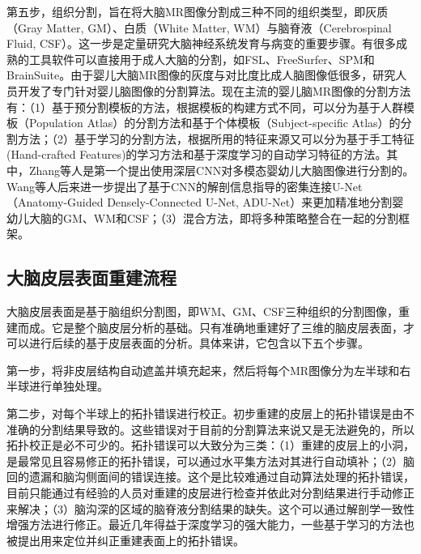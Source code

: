 第五步，组织分割，旨在将大脑MR图像分割成三种不同的组织类型，即灰质（Gray Matter, GM）、白质（White Matter, WM）与脑脊液（Cerebrospinal Fluid, CSF）。这一步是定量研究大脑神经系统发育与病变的重要步骤。有很多成熟的工具软件可以直接用于成人大脑的分割，如FSL\cite{jenkinson2012fsl}、FreeSurfer\cite{fischl2012freesurfer}、SPM\cite{tzourio2002automated}和BrainSuite\cite{shattuck2002brainsuite}。由于婴儿大脑MR图像的灰度与对比度比成人脑图像低很多，研究人员开发了专门针对婴儿脑图像的分割算法\cite{li2019computational}。现在主流的婴儿脑MR图像的分割方法有：（1）基于预分割模板的方法，根据模板的构建方式不同，可以分为基于人群模板（Population Atlas）的分割方法\cite{shi2011infant,wang2014segmentation}和基于个体模板（Subject-specific Atlas）的分割方法\cite{shi2010neonatal}；（2）基于学习的分割方法，根据所用的特征来源又可以分为基于手工特征(Hand-crafted Features)的学习方法\cite{anbeek2013automatic,wang2015links}和基于深度学习的自动学习特征的方法\cite{wang2018volume,nie2016fully,zhang2015deep}。其中，Zhang等人\cite{zhang2015deep}是第一个提出使用深层CNN对多模态婴幼儿大脑图像进行分割的。Wang等人\cite{wang2018volume}后来进一步提出了基于CNN的解剖信息指导的密集连接U-Net\cite{ronneberger2015u}（Anatomy-Guided Densely-Connected U-Net, ADU-Net）\cite{wang2018volume}来更加精准地分割婴幼儿大脑的GM、WM和CSF；（3）混合方法，即将多种策略整合在一起的分割框架\cite{beare2016neonatal,gui2012morphology}。


\subsection{大脑皮层表面重建流程}
大脑皮层表面是基于脑组织分割图，即WM、GM、CSF三种组织的分割图像，重建而成。它是整个脑皮层分析的基础。只有准确地重建好了三维的脑皮层表面，才可以进行后续的基于皮层表面的分析。具体来讲，它包含以下五个步骤。

第一步，将非皮层结构自动遮盖并填充起来，然后将每个MR图像分为左半球和右半球进行单独处理\cite{li2012consistent}。

第二步，对每个半球上的拓扑错误进行校正。初步重建的皮层上的拓扑错误是由不准确的分割结果导致的。这些错误对于目前的分割算法来说又是无法避免的，所以拓扑校正是必不可少的。拓扑错误可以大致分为三类：（1）重建的皮层上的小洞，是最常见且容易修正的拓扑错误，可以通过水平集方法\cite{han2003topology}对其进行自动填补；（2）脑回的遗漏和脑沟侧面间的错误连接。这个是比较难通过自动算法处理的拓扑错误，目前只能通过有经验的人员对重建的皮层进行检查并依此对分割结果进行手动修正来解决；（3）脑沟深的区域的脑脊液分割结果的缺失。这个可以通过解剖学一致性增强方法\cite{han2004cruise}进行修正。最近几年得益于深度学习的强大能力，一些基于学习的方法也被提出用来定位并纠正重建表面上的拓扑错误\cite{hao2016learning,sun2019topological}。

